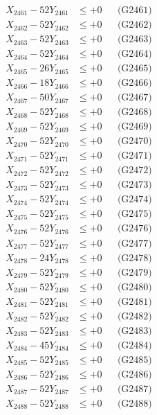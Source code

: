 \documentclass[a4paper,10pt]{article}
\begin{document}
{\begin{align}
\allowbreak
X_{2461} - 52Y_{2461} &\leq +0 && \text{(G2461)} \\
X_{2462} - 52Y_{2462} &\leq +0 && \text{(G2462)} \\
X_{2463} - 52Y_{2463} &\leq +0 && \text{(G2463)} \\
X_{2464} - 52Y_{2464} &\leq +0 && \text{(G2464)} \\
X_{2465} - 26Y_{2465} &\leq +0 && \text{(G2465)} \\
X_{2466} - 18Y_{2466} &\leq +0 && \text{(G2466)} \\
X_{2467} - 50Y_{2467} &\leq +0 && \text{(G2467)} \\
X_{2468} - 52Y_{2468} &\leq +0 && \text{(G2468)} \\
X_{2469} - 52Y_{2469} &\leq +0 && \text{(G2469)} \\
X_{2470} - 52Y_{2470} &\leq +0 && \text{(G2470)} \\
\allowbreak
X_{2471} - 52Y_{2471} &\leq +0 && \text{(G2471)} \\
X_{2472} - 52Y_{2472} &\leq +0 && \text{(G2472)} \\
X_{2473} - 52Y_{2473} &\leq +0 && \text{(G2473)} \\
X_{2474} - 52Y_{2474} &\leq +0 && \text{(G2474)} \\
X_{2475} - 52Y_{2475} &\leq +0 && \text{(G2475)} \\
X_{2476} - 52Y_{2476} &\leq +0 && \text{(G2476)} \\
X_{2477} - 52Y_{2477} &\leq +0 && \text{(G2477)} \\
X_{2478} - 24Y_{2478} &\leq +0 && \text{(G2478)} \\
X_{2479} - 52Y_{2479} &\leq +0 && \text{(G2479)} \\
X_{2480} - 52Y_{2480} &\leq +0 && \text{(G2480)} \\
\allowbreak
X_{2481} - 52Y_{2481} &\leq +0 && \text{(G2481)} \\
X_{2482} - 52Y_{2482} &\leq +0 && \text{(G2482)} \\
X_{2483} - 52Y_{2483} &\leq +0 && \text{(G2483)} \\
X_{2484} - 45Y_{2484} &\leq +0 && \text{(G2484)} \\
X_{2485} - 52Y_{2485} &\leq +0 && \text{(G2485)} \\
X_{2486} - 52Y_{2486} &\leq +0 && \text{(G2486)} \\
X_{2487} - 52Y_{2487} &\leq +0 && \text{(G2487)} \\
X_{2488} - 52Y_{2488} &\leq +0 && \text{(G2488)} \\

\end{align}}
\end{document}
